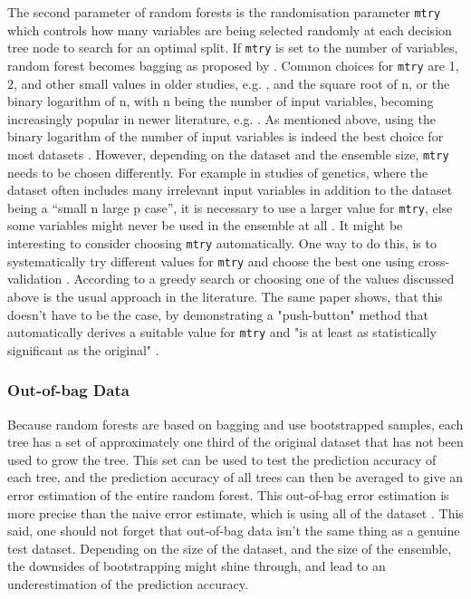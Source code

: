 \documentclass[a4paper,man,12pt,apacite,floatsintext,draftfirst]{apa6} %
\begin{document}
The second parameter of random forests is the randomisation parameter
\texttt{mtry} which controls how many variables are being selected randomly
at each decision tree node to search for an optimal split.
If \texttt{mtry} is set to the number of variables, random forest becomes
bagging as proposed by .
Common choices for \texttt{mtry} are 1, 2, and other small values in
older studies, e.g. , and the square root of n,
or the binary logarithm of n, with n being the number of input variables,
becoming increasingly popular in newer literature, e.g.
.
As mentioned above, using the binary logarithm of the number of
input variables is indeed the best choice for most datasets
\cite{banfield2007comparison}.
However, depending on the dataset and the ensemble size, \texttt{mtry}
needs to be chosen differently.
For example in studies of genetics, where the dataset often includes many
irrelevant input variables in addition to the dataset being a
“small n large p case”, it is necessary to use a larger value
for \texttt{mtry}, else some variables might never be used in the ensemble
at all \cite{strobl2009introduction}.
It might be interesting to consider choosing \texttt{mtry} automatically.
One way to do this, is to systematically try different values for \texttt{mtry}
and choose the best one using cross-validation \cite{psymeth}.
According to  a greedy search or choosing one of
the values discussed above is the usual approach in the literature.
The same paper shows, that this doesn't have to be the case, by demonstrating
a "push-button" method that automatically derives a suitable value for
\texttt{mtry} and "is at least as statistically significant as the original"
\cite{bernard2008forest}.

\subsubsection{Out-of-bag Data}
Because random forests are based on bagging and use bootstrapped samples,
each tree has a set of approximately one third of the original dataset
that has not been used to grow the tree.
This set can be used to test the prediction accuracy of each tree,
and the prediction accuracy of all trees can then be averaged to give an
error estimation of the entire random forest.
This out-of-bag error estimation is more precise than the naive error
estimate, which is using all of the dataset \cite{strobl2009introduction}.
This said, one should not forget that out-of-bag data isn't the
same thing as a genuine test dataset.
Depending on the size of the dataset, and the size of the ensemble,
the downsides
of bootstrapping might shine through, and lead to an underestimation of
the prediction accuracy.
\end{document}
